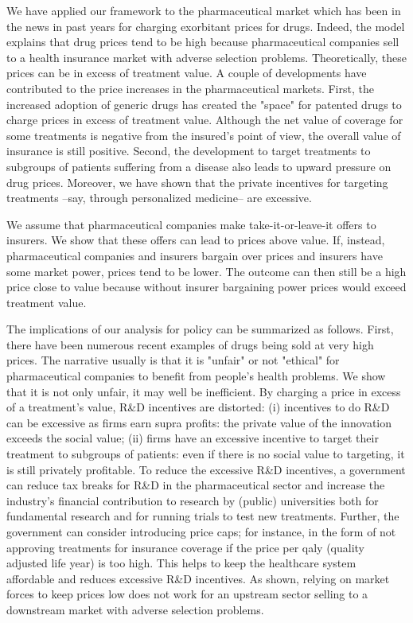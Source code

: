 \documentclass[a4paper,12pt]{article}
\begin{document}
We have applied our framework to the pharmaceutical market which has been in the news in past years for charging exorbitant prices for drugs. Indeed, the model explains that drug prices tend to be high because pharmaceutical companies sell to a health insurance market with adverse selection problems. Theoretically, these prices can be in excess of treatment value. A couple of developments have contributed to the price increases in the pharmaceutical markets. First, the increased adoption of generic drugs has created the "space" for patented drugs to charge prices in excess of treatment value. Although the net value of coverage for some treatments is negative from the insured's point of view, the overall value of insurance is still positive. Second, the development to target treatments to subgroups of patients suffering from a disease also leads to upward pressure on drug prices. Moreover, we have shown that the private incentives for targeting treatments --say, through personalized medicine-- are excessive.

We assume that pharmaceutical companies make take-it-or-leave-it offers to insurers. We show that these offers can lead to prices above value. If, instead, pharmaceutical companies and insurers bargain over prices and insurers have some market power, prices tend to be lower. The outcome can then still be a high price close to value because without insurer bargaining power prices would exceed treatment value.

The implications of our analysis for policy can be summarized as follows. First, there have been numerous recent examples of drugs being sold at very high prices. The narrative usually is that it is "unfair" or not "ethical" for pharmaceutical companies to benefit from people's health problems. We show that it is not only unfair, it may well be inefficient. By charging a price in excess of a treatment's value, R\&D incentives are distorted: (i) incentives to do R\&D can be excessive as firms earn supra profits: the private value of the innovation exceeds the social value; (ii) firms have an excessive incentive to target their treatment to subgroups of patients: even if there is no social value to targeting, it is still privately profitable. To reduce the excessive R\&D incentives, a government can reduce tax breaks for R\&D in the pharmaceutical sector and increase the industry's financial contribution to research by (public) universities both for fundamental research and for running trials to test new treatments. Further, the government can consider introducing price caps; for instance, in the form of not approving treatments for insurance coverage if the price per qaly (quality adjusted life year) is too high. This helps to keep the healthcare system affordable and reduces excessive R\&D incentives. As shown, relying on market forces to keep prices low does not work for an upstream sector selling to a downstream market with adverse selection problems.
\end{document}
